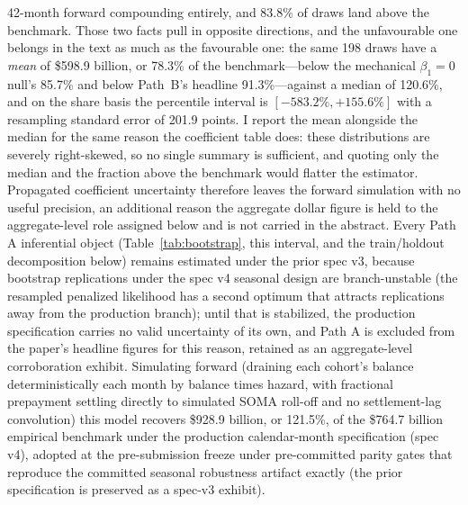 \documentclass[12pt]{article}
\begin{document}
42-month forward compounding entirely, and 83.8\% of draws land above the benchmark. Those two facts pull in opposite directions, and the unfavourable one belongs in the text as much as the favourable one: the same 198 draws have a \emph{mean} of \$598.9 billion, or 78.3\% of the benchmark---below the mechanical $\beta_1 = 0$ null's 85.7\% and below Path~B's headline 91.3\%---against a median of 120.6\%, and on the share basis the percentile interval is $[-583.2\%, +155.6\%]$ with a resampling standard error of 201.9 points. I report the mean alongside the median for the same reason the coefficient table does: these distributions are severely right-skewed, so no single summary is sufficient, and quoting only the median and the fraction above the benchmark would flatter the estimator. Propagated coefficient uncertainty therefore leaves the forward simulation with no useful precision, an additional reason the aggregate dollar figure is held to the aggregate-level role assigned below and is not carried in the abstract. Every Path A inferential object (Table~\ref{tab:bootstrap}, this interval, and the train/holdout decomposition below) remains estimated under the prior spec v3, because bootstrap replications under the spec v4 seasonal design are branch-unstable (the resampled penalized likelihood has a second optimum that attracts replications away from the production branch); until that is stabilized, the production specification carries no valid uncertainty of its own, and Path A is excluded from the paper's headline figures for this reason, retained as an aggregate-level corroboration exhibit. Simulating forward (draining each cohort's balance deterministically each month by balance times hazard, with fractional prepayment settling directly to simulated SOMA roll-off and no settlement-lag convolution) this model recovers \$928.9 billion, or 121.5\%, of the \$764.7 billion empirical benchmark under the production calendar-month specification (spec v4), adopted at the pre-submission freeze under pre-committed parity gates that reproduce the committed seasonal robustness artifact exactly (the prior specification is preserved as a spec-v3 exhibit).
\end{document}
